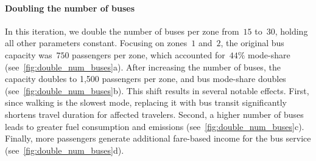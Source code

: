 \paragraph*{Doubling the number of buses}
In this iteration, we double the number of buses per zone from~$15$ to~$30$, holding all other parameters constant. 
Focusing on zones~$1$ and~$2$, the original bus capacity was~$750$ passengers per zone, which accounted for~$44\%$ mode-share (see~\cref{fig:double_num_buses}a).
After increasing the number of buses, the capacity doubles to 1,500 passengers per zone, and bus mode-share doubles (see~\cref{fig:double_num_buses}b).
This shift results in several notable effects.
First, since walking is the slowest mode, replacing it with bus transit significantly shortens travel duration for affected travelers.
Second, a higher number of buses leads to greater fuel consumption and emissions (see~\cref{fig:double_num_buses}c).
Finally, more passengers generate additional fare-based income for the bus service (see~\cref{fig:double_num_buses}d).



% 





